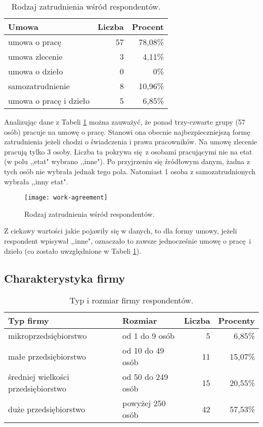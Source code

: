 \begin{table}[h!]
\begin{center}
\begin{tabular}{l r r}
Umowa & Liczba & Procent \\ \hline
umowa o pracę & 57 & 78,08\% \\
umowa zlecenie & 3 & 4,11\% \\
umowa o dzieło & 0 & 0\% \\
samozatrudnienie & 8 & 10,96\% \\
umowa o pracę i dzieło & 5 & 6,85\% \\
\end{tabular}
\end{center}
\caption{Rodzaj zatrudnienia wśród respondentów.}
\label{tab:work-time-stats}
\end{table}

Analizując dane z Tabeli \ref{tab:work-time-stats} można zauważyć, że ponad trzy-czwarte grupy (57 osób) pracuje na umowę o pracę. Stanowi ona obecnie najbezpieczniejszą formę zatrudnienia jeżeli chodzi o świadczenia i prawa pracowników. Na umowę zlecenie pracują tylko 3 osoby. Liczba ta pokrywa się z osobami pracującymi nie na etat (w polu ,,etat" wybrano ,,inne"). Po przyjrzeniu się źródłowym danym, żadna z tych osób nie wybrała jednak tego pola. Natomiast 1 osoba z
samozatrudnionych wybrała ,,inny etat". 

\begin{figure}[htb]
\begin{center}
\texttt{[image: work-agreement]}
\end{center}
\caption{Rodzaj zatrudnienia wśród respondentów.}
\label{fig:work-agreement}
\end{figure}

Z ciekawy wartości jakie pojawiły się w danych, to dla formy umowy, jeżeli respondent wpisywał ,,inne", oznaczało to zawsze jednocześnie umowę o pracę i dzieło (co zostało uwzględnione w Tabeli \ref{tab:work-time-stats}).

\subsection{Charakterystyka firmy}

\begin{table}[h!]
\begin{center}
\begin{tabular}{l l r r}
Typ firmy & Rozmiar & Liczba & Procenty \\ \hline
mikroprzedsiębiorstwo & od 1 do 9 osób & 5 & 6,85\% \\
małe przedsiębiorstwo & od 10 do 49 osób & 11 & 15,07\% \\
średniej wielkości przedsiębiorstwo & od 50 do 249 osób & 15 & 20,55\% \\
duże przedsiębiorstwo & powyżej 250 osób & 42 & 57,53\% \\
\end{tabular}
\end{center}
\caption{Typ i rozmiar firmy respondentów.}
\label{tab:company-size}
\end{table}

